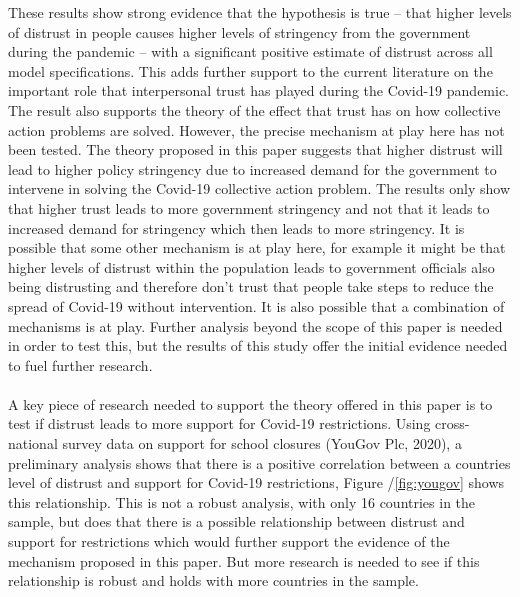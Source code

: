 \documentclass[
  11pt,
]{article}
\begin{document}
These results show strong evidence that the hypothesis is true -- that higher levels of distrust in people causes higher levels of stringency from the government during the pandemic -- with a significant positive estimate of distrust across all model specifications. This adds further support to the current literature on the important role that interpersonal trust has played during the Covid-19 pandemic. The result also supports the theory of the effect that trust has on how collective action problems are solved. However, the precise mechanism at play here has not been tested. The theory proposed in this paper suggests that higher distrust will lead to higher policy stringency due to increased demand for the government to intervene in solving the Covid-19 collective action problem. The results only show that higher trust leads to more government stringency and not that it leads to increased demand for stringency which then leads to more stringency. It is possible that some other mechanism is at play here, for example it might be that higher levels of distrust within the population leads to government officials also being distrusting and therefore don't trust that people take steps to reduce the spread of Covid-19 without intervention. It is also possible that a combination of mechanisms is at play. Further analysis beyond the scope of this paper is needed in order to test this, but the results of this study offer the initial evidence needed to fuel further research.\\
~\\
A key piece of research needed to support the theory offered in this paper is to test if distrust leads to more support for Covid-19 restrictions. Using cross-national survey data on support for school closures (YouGov Plc, 2020), a preliminary analysis shows that there is a positive correlation between a countries level of distrust and support for Covid-19 restrictions, Figure /\ref{fig:yougov} shows this relationship. This is not a robust analysis, with only 16 countries in the sample, but does that there is a possible relationship between distrust and support for restrictions which would further support the evidence of the mechanism proposed in this paper. But more research is needed to see if this relationship is robust and holds with more countries in the sample.\\
~\\
\end{document}
